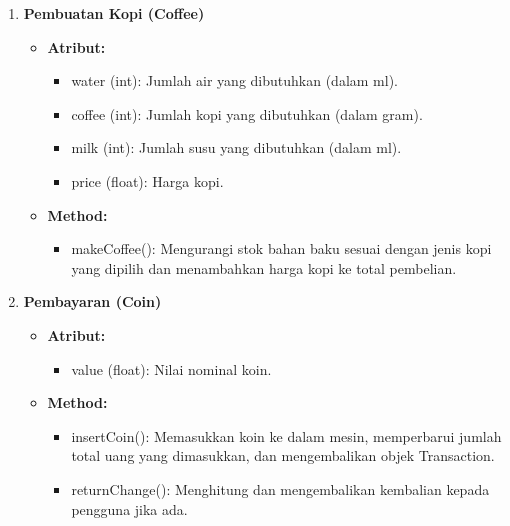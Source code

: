 \documentclass[12pt]{article}
\begin{document}
\begin{enumerate}
    \item \textbf{Pembuatan Kopi (Coffee)}
    \begin{itemize}
        \item \textbf{Atribut:}
        \begin{itemize}
            \item water (int): Jumlah air yang dibutuhkan (dalam ml).
            \item coffee (int): Jumlah kopi yang dibutuhkan (dalam gram).
            \item milk (int): Jumlah susu yang dibutuhkan (dalam ml).
            \item price (float): Harga kopi.
        \end{itemize}
        \item \textbf{Method:}
        \begin{itemize}
            \item makeCoffee(): Mengurangi stok bahan baku sesuai dengan jenis kopi yang dipilih dan menambahkan harga kopi ke total pembelian.
        \end{itemize}
    \end{itemize}


    \item \textbf{Pembayaran (Coin)}
    \begin{itemize}
        \item \textbf{Atribut:}
        \begin{itemize}
            \item value (float): Nilai nominal koin.
        \end{itemize}
        \item \textbf{Method:}
        \begin{itemize}
            \item insertCoin(): Memasukkan koin ke dalam mesin, memperbarui jumlah total uang yang dimasukkan, dan mengembalikan objek Transaction.
            \item returnChange(): Menghitung dan mengembalikan kembalian kepada pengguna jika ada.
        \end{itemize}
    \end{itemize}


\end{enumerate}
\end{document}
